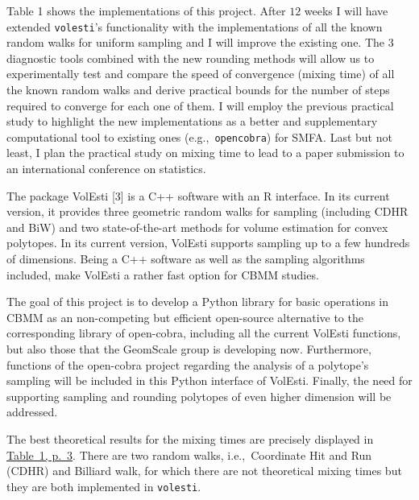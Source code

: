 \documentclass[a4paper, 12pt]{article}
\def\volesti{{\tt volesti}}
\begin{document}
Table 1 shows the implementations of this project. After $12$ weeks I will have extended \volesti's functionality with the implementations of all the known random walks for uniform sampling and I will improve the existing one. The $3$ diagnostic tools combined with the new rounding methods will allow us to experimentally test and compare the speed of convergence (mixing time) of all the known random walks and derive practical bounds for the number of steps required to converge for each one of them. I will employ the previous practical study to highlight the new implementations as a better and supplementary computational tool to existing ones (e.g.,\ {\tt opencobra}) for SMFA. Last but not least, I plan the practical study on mixing time to lead to a paper submission to an international conference on statistics.



The package VolEsti [3] is a C++ software with an R interface. In its current version, it provides three geometric random walks for sampling (including CDHR and BiW) and two state-of-the-art methods for volume estimation for convex polytopes. In its current version, VolEsti supports sampling up to a few hundreds of dimensions. Being a C++ software as well as the sampling algorithms included, make VolEsti a rather fast option for CBMM studies. 


The goal of this project is to develop a Python library for basic operations in CBMM as an non-competing but efficient open-source alternative to the corresponding library of open-cobra, including all the current VolEsti functions, but also those that the GeomScale group is developing now. Furthermore, functions of the open-cobra project regarding the analysis of a polytope’s  sampling will be included in this Python interface of VolEsti. Finally, the need for supporting sampling and rounding polytopes of even higher dimension will be addressed. 









The best theoretical results for the mixing times are precisely displayed in \textcolor{blue}{\href{https://arxiv.org/abs/1911.05656}{Table~1, p.~3}}. There are two random walks, i.e.,\ Coordinate Hit and Run (CDHR) and Billiard walk, for which there are not theoretical mixing times but they are both implemented in \volesti.
\end{document}
